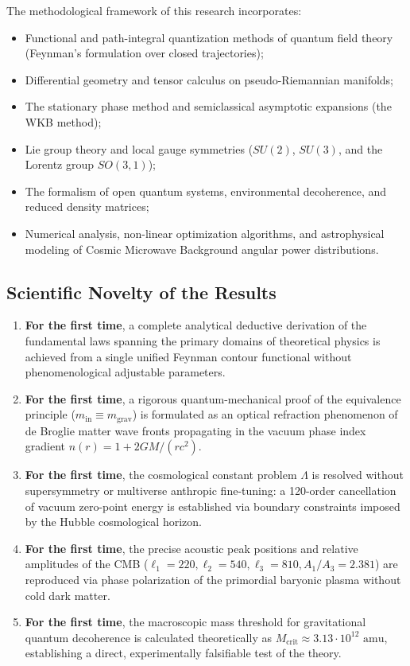 \documentclass[11pt,a4paper]{article}
\theoremstyle{definition}
\begin{document}
The methodological framework of this research incorporates:
\begin{itemize}
\item Functional and path-integral quantization methods of quantum field theory (Feynman's formulation over closed trajectories);
\item Differential geometry and tensor calculus on pseudo-Riemannian manifolds;
\item The stationary phase method and semiclassical asymptotic expansions (the WKB method);
\item Lie group theory and local gauge symmetries ($SU(2)$, $SU(3)$, and the Lorentz group $SO(3,1)$);
\item The formalism of open quantum systems, environmental decoherence, and reduced density matrices;
\item Numerical analysis, non-linear optimization algorithms, and astrophysical modeling of Cosmic Microwave Background angular power distributions.
\end{itemize}

\subsection{Scientific Novelty of the Results}\label{subsec:novelty}

\begin{enumerate}
\item \textbf{For the first time}, a complete analytical deductive derivation of the fundamental laws spanning the primary domains of theoretical physics is achieved from a single unified Feynman contour functional without phenomenological adjustable parameters.
\item \textbf{For the first time}, a rigorous quantum-mechanical proof of the equivalence principle ($m_{\text{in}} \equiv m_{\text{grav}}$) is formulated as an optical refraction phenomenon of de Broglie matter wave fronts propagating in the vacuum phase index gradient $n(r) = 1 + 2GM/(rc^2)$.
\item \textbf{For the first time}, the cosmological constant problem $\Lambda$ is resolved without supersymmetry or multiverse anthropic fine-tuning: a 120-order cancellation of vacuum zero-point energy is established via boundary constraints imposed by the Hubble cosmological horizon.
\item \textbf{For the first time}, the precise acoustic peak positions and relative amplitudes of the CMB ($\ell_1=220, \ell_2=540, \ell_3=810, A_1/A_3=2.381$) are reproduced via phase polarization of the primordial baryonic plasma without cold dark matter.
\item \textbf{For the first time}, the macroscopic mass threshold for gravitational quantum decoherence is calculated theoretically as $M_{\text{crit}} \approx 3.13 \cdot 10^{12}\text{ amu}$, establishing a direct, experimentally falsifiable test of the theory.
\end{enumerate}
\end{document}
